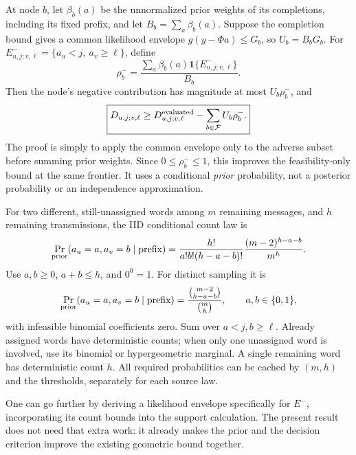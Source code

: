 \documentclass[10pt,a4paper]{article}
\newcommand{\ind}{\mathbf 1}
\begin{document}
At node $b$, let $\beta_b(a)$ be the unnormalized prior weights of its completions, including its fixed prefix,
and let $B_b=\sum_a\beta_b(a)$. Suppose the completion bound gives a common likelihood envelope
$g(y-\Phi a)\leq G_b$, so $U_b=B_bG_b$.
For $E^-_{u,j;v,\ell}=\{a_u<j,\ a_v\geq\ell\}$, define
\[
 \rho_b^-=
 \frac{\sum_a\beta_b(a)\ind\{E^-_{u,j;v,\ell}\}}{B_b}.
\]
Then the node's negative contribution has magnitude at most $U_b\rho_b^-$, and
\begin{equation}
 \boxed{D_{u,j;v,\ell}\geq D_{u,j;v,\ell}^{\rm evaluated}
                  -\sum_{b\in\mathcal F}U_b\rho_b^-.}
 \label{eq:prior-weighted-contrast}
\end{equation}
The proof is simply to apply the common envelope only to the adverse subset before summing prior weights.
Since $0\leq\rho_b^-\leq1$, this improves the feasibility-only bound at the same frontier.
It uses a conditional \emph{prior} probability, not a posterior probability or an independence approximation.

For two different, still-unassigned words among $m$ remaining messages, and $h$ remaining transmissions,
the IID conditional count law is
\[
 \Pr_{\rm prior}(a_u=a,a_v=b\mid\text{prefix})
 =\frac{h!}{a!b!(h-a-b)!}\frac{(m-2)^{h-a-b}}{m^h}.
\]
Use $a,b\geq0$, $a+b\leq h$, and $0^0=1$. For distinct sampling it is
\[
 \Pr_{\rm prior}(a_u=a,a_v=b\mid\text{prefix})
 =\frac{\binom{m-2}{h-a-b}}{\binom mh},\qquad a,b\in\{0,1\},
\]
with infeasible binomial coefficients zero. Sum over $a<j,b\geq\ell$.
Already assigned words have deterministic counts; when only one unassigned word is involved, use its
binomial or hypergeometric marginal. A single remaining word has deterministic count $h$.
All required probabilities can be cached by $(m,h)$ and the thresholds, separately for each source law.

One can go further by deriving a likelihood envelope specifically for $E^-$, incorporating its count bounds
into the support calculation. The present result does not need that extra work: it already makes the prior
and the decision criterion improve the existing geometric bound together.

\clearpage
\end{document}
